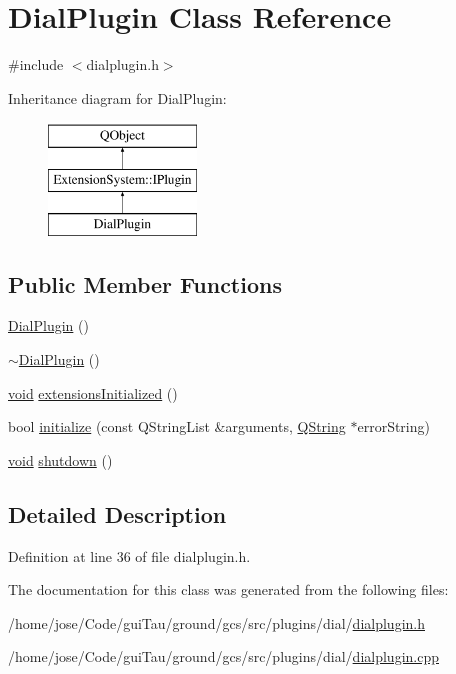 \hypertarget{class_dial_plugin}{\section{Dial\-Plugin Class Reference}
\label{class_dial_plugin}
}


{\ttfamily \#include $<$dialplugin.\-h$>$}

Inheritance diagram for Dial\-Plugin\-:\begin{figure}[H]
\begin{center}
\leavevmode
\includegraphics[height=3.000000cm]{class_dial_plugin}
\end{center}
\end{figure}
\subsection*{Public Member Functions}
\begin{DoxyCompactItemize}
\item 
\hyperlink{group___dial_plugin_ga414d0b2d29e6c9d41df85ac25e1899fa}{Dial\-Plugin} ()
\item 
\hyperlink{group___dial_plugin_gaea6ec646d171578f8a22d63b9b28016c}{$\sim$\-Dial\-Plugin} ()
\item 
\hyperlink{group___u_a_v_objects_plugin_ga444cf2ff3f0ecbe028adce838d373f5c}{void} \hyperlink{group___dial_plugin_gac703254d72e140e8ff7b4c23ddb46020}{extensions\-Initialized} ()
\item 
bool \hyperlink{group___dial_plugin_ga59561e7e0f5635938f8b83931c025b67}{initialize} (const Q\-String\-List \&arguments, \hyperlink{group___u_a_v_objects_plugin_gab9d252f49c333c94a72f97ce3105a32d}{Q\-String} $\ast$error\-String)
\item 
\hyperlink{group___u_a_v_objects_plugin_ga444cf2ff3f0ecbe028adce838d373f5c}{void} \hyperlink{group___dial_plugin_ga096efc39bed83964551f3a4a8bd1a29d}{shutdown} ()
\end{DoxyCompactItemize}


\subsection{Detailed Description}


Definition at line 36 of file dialplugin.\-h.



The documentation for this class was generated from the following files\-:\begin{DoxyCompactItemize}
\item 
/home/jose/\-Code/gui\-Tau/ground/gcs/src/plugins/dial/\hyperlink{dialplugin_8h}{dialplugin.\-h}\item 
/home/jose/\-Code/gui\-Tau/ground/gcs/src/plugins/dial/\hyperlink{dialplugin_8cpp}{dialplugin.\-cpp}\end{DoxyCompactItemize}
